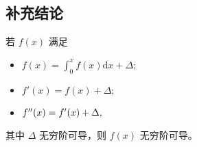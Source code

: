 \begin{Appendices}[附录]

\chapter{补充结论}


若 $ f(x) $ 满足
\begin{itemize}
    \item $ f(x)=\int_0^xf(x)\mathrm{d}x + \Delta; $ 
    \item $ f'(x)=f(x)+\Delta; $ 
    \item $ f^{\prime\prime}(x) = f'(x) + \Delta,$ 
\end{itemize}

其中 $ \Delta $ 无穷阶可导，则 $ f(x) $ 无穷阶可导。

\end{Appendices}